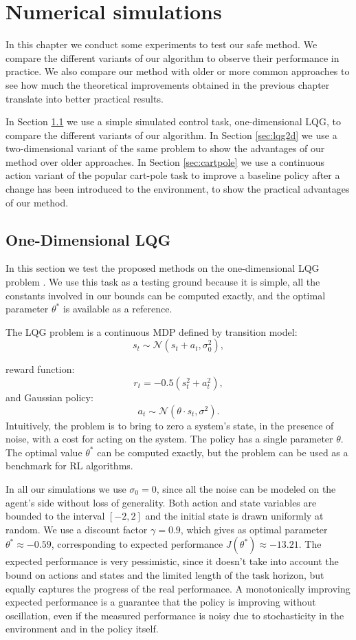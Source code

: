 \chapter{Numerical simulations}\label{sec:simul}

In this chapter we conduct some experiments to test our safe method. We compare the different variants of our algorithm to observe their performance in practice. We also compare our method with older or more common approaches to see how much the theoretical improvements obtained in the previous chapter translate into better practical results.

In Section \ref{sec:lqg1d} we use a simple simulated control task, one-dimensional \ac{LQG}, to compare the different variants of our algorithm.
In Section \ref{sec:lqg2d} we use a two-dimensional variant of the same problem to show the advantages of our method over older approaches.
In Section \ref{sec:cartpole} we use a continuous action variant of the popular cart-pole task to improve a baseline policy after a change has been introduced to the environment, to show the practical advantages of our method.

\section{One-Dimensional LQG}\label{sec:lqg1d}
In this section we test the proposed methods on the one-dimensional \ac{LQG} problem \cite{4867}. We use this task as a testing ground because it is simple, all the constants involved in our bounds can be computed exactly, and the optimal parameter $\theta^*$ is available as a reference.

The LQG problem is a continuous \ac{MDP} defined by transition model:
\[
	s_t \sim \mathcal{N}(s_t+a_t,\sigma_0^2),
\] 

reward function:
\[
	r_t=-0.5(s_t^2+a_t^2),
\]
and Gaussian policy:
\[
	a_t \sim \mathcal{N}(\theta\cdot s_t,\sigma^2).
\]
Intuitively, the problem is to bring to zero a system's state, in the presence of noise, with a cost for acting on the system.
The policy has a single parameter $\theta$. The optimal value $\theta^*$ can be computed exactly, but the problem can be used as a benchmark for \ac{RL} algorithms.

In all our simulations we use $\sigma_0 = 0$, since all the noise can be modeled on the agent's side without loss of generality. Both action and state variables are bounded to the interval $[-2,2]$ and the initial state is drawn uniformly at random.  
We use a discount factor $\gamma=0.9$, which gives as optimal parameter $\theta^* \approx -0.59$, corresponding to expected performance $J(\theta^*) \approx -13.21$. The expected performance is very pessimistic, since it doesn't take into account the bound on actions and states and the limited length of the task horizon, but equally captures the progress of the real performance. A monotonically improving expected performance is a guarantee that the policy is improving without oscillation, even if the measured performance is noisy due to stochasticity in the environment and in the policy itself.
